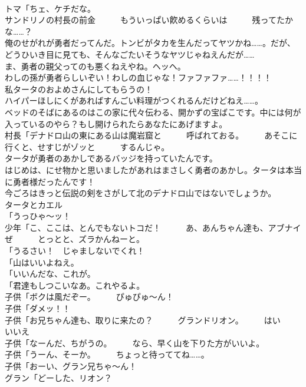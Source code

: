 \documentclass[8pt]{extreport}
\begin{document}
\begin{CJK}{UTF8}{min}
\\	トマ「ちェ、ケチだな。	
\\	サンドリノの村長の前金　　　もういっぱい飮めるくらいは　　　残ってたかな……？	
\\	俺のせがれが勇者だってんだ。トンビがタカを生んだってヤツかね……。だが、どうひいき目に見ても、そんなごたいそうなヤツじゃねえんだが……	
\\	ま、勇者の親父ってのも悪くねえやね。ヘッヘ。	
\\	わしの孫が勇者らしいぞい！わしの血じゃな！ファファファ……！！！！	
\\	私タータのおよめさんにしてもらうの！	
\\	ハイパーほしにくがあればすんごい料理がつくれるんだけどねえ……。	
\\	ベッドのそばにあるのはこの家に代々伝わる、開かずの宝ばこです。中には何が入っているのやら？もし開けられたらあなたにあげますよ。	
\\	村長「デナドロ山の東にある山は魔岩窟と　　　呼ばれておる。　　　あそこに行くと、せすじがゾッと　　　するんじゃ。	
\\	タータが勇者のあかしであるバッジを持っていたんです。	
\\	はじめは、にせ物かと思いましたがあれはまさしく勇者のあかし。タータは本当に勇者様だったんです！	
\\	今ごろはきっと伝説の剣をさがして北のデナドロ山ではないでしょうか。	
\\	タータとカエル	
\\	「うっひゃ～ッ！	
\\	少年「こ、ここは、とんでもないトコだ！　　　あ、あんちゃん達も、アブナイぜ　　　とっとと、ズラかんねーと。	
\\	「うるさい！　じゃましないでくれ！	
\\	「山はいいよねえ。	
\\	「いいんだな、これが。	
\\	「君達もしつこいなあ。これやるよ。	
\\	子供「ボクは風だぞー。　　　ぴゅぴゅ～ん！	
\\	子供「ダメッ！！	
\\	子供「お兄ちゃん達も、取りに来たの？　　　グランドリオン。　　　はい　　　いいえ	
\\	子供「なーんだ、ちがうの。　　　なら、早く山を下りた方がいいよ。	
\\	子供「うーん、そーか。　　　ちょっと待っててね……。	
\\	子供「おーい、グラン兄ちゃ～ん！	
\\	グラン「どーした、リオン？	

\end{CJK}
\end{document}
